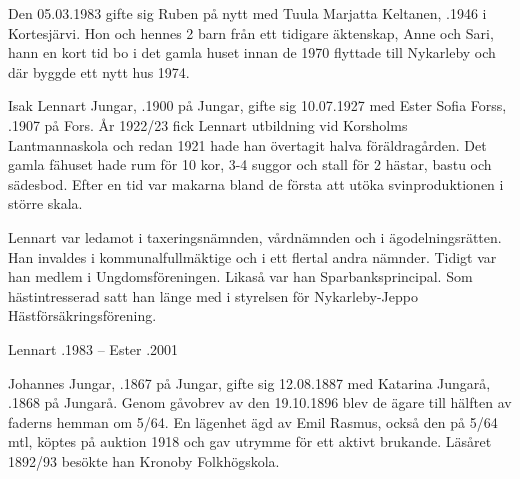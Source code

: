 Den 05.03.1983 gifte sig Ruben på nytt med Tuula Marjatta Keltanen, .1946 i Kortesjärvi. Hon och hennes 2 barn från ett tidigare äktenskap, Anne och Sari, hann en kort tid bo i det gamla huset innan de 1970 flyttade till Nykarleby och där byggde ett nytt hus 1974.


Isak Lennart Jungar, .1900 på Jungar, gifte sig 10.07.1927 med Ester Sofia Forss, .1907 på Fors. År 1922/23 fick Lennart utbildning vid Korsholms Lantmannaskola och redan 1921 hade han övertagit halva föräldragården. Det gamla fähuset hade rum för 10 kor, 3-4 suggor och stall för 2 hästar, bastu och sädesbod. Efter en tid var makarna bland de första att utöka svinproduktionen i större  skala.

Lennart var ledamot i taxeringsnämnden, vårdnämnden och i ägodelningsrätten. Han invaldes i kommunalfullmäktige och i ett
flertal andra nämnder. Tidigt var han medlem i Ungdomsföreningen. Likaså var han Sparbanksprincipal. Som hästintresserad satt han länge med i styrelsen för Nykarleby-Jeppo Hästförsäkringsförening.
\begin{jhchildren}
  \item {}
  \item {}
  \item {}
  \item {}
\end{jhchildren}
Lennart .1983  --  Ester .2001


Johannes Jungar, .1867 på Jungar, gifte sig 12.08.1887 med Katarina Jungarå, .1868 på Jungarå. Genom gåvobrev av den 19.10.1896 blev de ägare till hälften av faderns hemman om 5/64. En lägenhet ägd av Emil Rasmus, också den på 5/64 mtl, köptes på auktion 1918 och gav utrymme för ett aktivt brukande. Läsåret 1892/93 besökte han Kronoby Folkhögskola.

